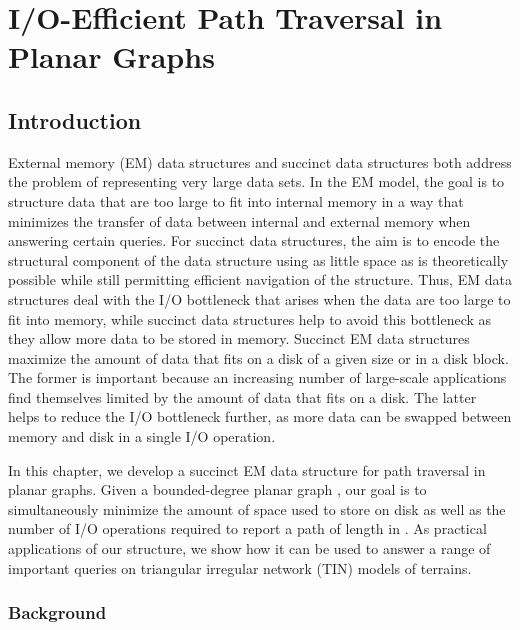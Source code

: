 

\chapter[Traversal in Planar Graphs]{I/O-Efficient Path Traversal in Planar 
  Graphs}\label{chp:succinct_graphs}

\section{Introduction}


External memory (EM) data structures and succinct data structures both
address the problem of representing very large data sets.
In the EM model, the goal is to structure data that are too large to fit into
internal memory in a way that minimizes the transfer of data between
internal and external memory when answering certain queries.
For succinct data structures, the aim is to encode the structural
component of the data structure using as little space as is
theoretically possible while still permitting efficient navigation of
the structure.
Thus, EM data structures deal with the I/O bottleneck
that arises when the data are too large to fit into memory, while
succinct data structures help to avoid this bottleneck as they allow
more data to be stored in memory.
Succinct EM data structures maximize the amount of data that fits on a disk of
a given size or in a disk block.
The former is important because an increasing number of
large-scale applications find themselves limited by the amount of data
that fits on a disk.
The latter helps to reduce the I/O bottleneck further, as more data
can be swapped between memory and disk in a single I/O operation.

In this chapter, we develop a succinct EM data structure for path
traversal in planar graphs.
Given a bounded-degree planar graph ,
our goal is to simultaneously minimize the amount of space used to
store  on disk as well as the number of I/O operations required to report
a path of length  in .
As practical applications of our
structure, we show how it can be used to answer a range of important
queries on triangular irregular network (TIN) models of terrains.

\subsection{Background}\label{sec:background}


